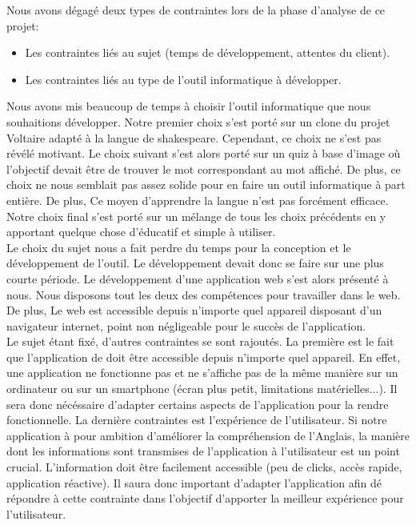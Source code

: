 \documentclass[a4paper,11pt, oneside]{book}
\begin{document}
	Nous avons dégagé deux types de contraintes lors de la phase d'analyse de ce projet:
	\begin{itemize}
		\item Les contraintes liés au sujet (temps de développement, attentes du client).
		\item Les contraintes liés au type de l'outil informatique à développer.\\
	\end{itemize}

Nous avons mis beaucoup de temps à choisir l'outil informatique que nous souhaitions développer. Notre premier choix s'est porté sur un clone du projet Voltaire adapté à la langue de shakespeare.
Cependant, ce choix ne s'est pas révélé motivant. Le choix suivant s'est alors porté sur un quiz à base d'image où l'objectif devait être de trouver le mot correspondant au mot affiché. De plus, ce choix
ne nous semblait pas assez solide pour en faire un outil informatique à part entière. De plus, Ce moyen d'apprendre la langue n'est pas forcément efficace.
Notre choix final s'est porté sur un mélange de tous les choix précédents en y apportant quelque chose d'éducatif et simple à utiliser.\\

Le choix du sujet nous a fait perdre du temps pour la conception et le développement de l'outil. Le développement devait donc se faire sur une plus courte période.
Le développement d'une application web s'est alors présenté à nous. Nous disposons tout les deux des compétences pour travailler dans le web.
De plus, Le web est accessible depuis n'importe quel appareil disposant d'un navigateur internet, point non négligeable pour le succès de l'application.\\

Le sujet étant fixé, d'autres contraintes se sont rajoutés. La première est le fait que l'application de doit être accessible depuis n'importe quel appareil. En effet,
une application ne fonctionne pas et ne s'affiche pas de la même manière sur un ordinateur ou sur un smartphone (écran plus petit, limitations matérielles...). Il sera donc nécéssaire
d'adapter certains aspects de l'application pour la rendre fonctionnelle. La dernière contraintes est l'expérience de l'utilisateur. Si notre application à pour ambition d'améliorer
la compréhension de l'Anglais, la manière dont les informations sont transmises de l'application à l'utilisateur est un point crucial. L'information doit être facilement accessible (peu de clicks, accès rapide, application réactive).
Il saura donc important d'adapter l'application afin dé répondre à cette contrainte dans l'objectif d'apporter la meilleur expérience pour l'utilisateur.
\end{document}
